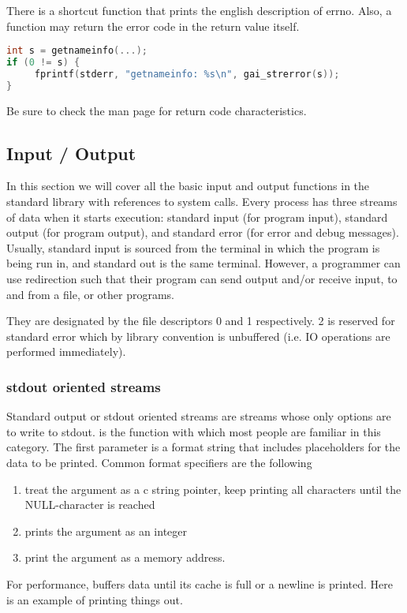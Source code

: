There is a shortcut function  that prints the english description of errno.
Also, a function may return the error code in the return value itself.

\begin{lstlisting}[language=C]
int s = getnameinfo(...);
if (0 != s) {
     fprintf(stderr, "getnameinfo: %s\n", gai_strerror(s));
}
\end{lstlisting}

Be sure to check the man page for return code characteristics.

\subsection{Input / Output}

In this section we will cover all the basic input and output functions in the standard library with references to system calls.
Every process has three streams of data when it starts execution: standard input (for program input), standard output (for program output), and standard error (for error and debug messages).
Usually, standard input is sourced from the terminal in which the program is being run in, and standard out is the same terminal.
However, a programmer can use redirection such that their program can send output and/or receive input, to and from a file, or other programs.

They are designated by the file descriptors 0 and 1 respectively. 2 is reserved for standard error which by library convention is unbuffered (i.e. IO operations are performed immediately).

\subsubsection{stdout oriented streams}

Standard output or stdout oriented streams are streams whose only options are to write to stdout.
 is the function with which most people are familiar in this category.
The first parameter is a format string that includes placeholders for the data to be printed.
Common format specifiers are the following
\begin{enumerate}
\item {} treat the argument as a c string pointer, keep printing all characters until the NULL-character is reached
\item {} prints the argument as an integer
  \item {} print the argument as a memory address.
    \end{enumerate}
For performance,  buffers data until its cache is full or a newline is printed.
Here is an example of printing things out.

